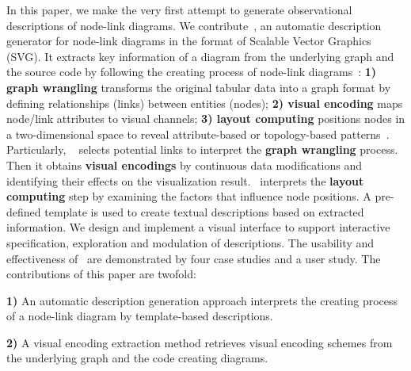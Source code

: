 In this paper, we make the very first attempt to generate observational descriptions of node-link diagrams.
We contribute~\textit{\ApproachName}, an automatic description generator for node-link diagrams in the format of Scalable Vector Graphics (SVG). 
It extracts key information of a diagram from the underlying graph and the source code by following the creating process of node-link diagrams~\cite{DBLP:journals/cgf/SpritzerBDFF15, tvcg/RomatAP21}:
\textbf{1) graph wrangling} transforms the original tabular data into a graph format by defining relationships (links) between entities (nodes);
\textbf{2) visual encoding} maps node/link attributes to visual channels;
\textbf{3) layout computing} positions nodes in a two-dimensional space to reveal attribute-based or topology-based patterns~\cite{DBLP:journals/cgf/NobreMSL19}.
Particularly, \ApproachName~
selects potential links to interpret the \textbf{graph wrangling} process.
Then it obtains \textbf{visual encodings} by continuous data modifications and identifying their effects on the visualization result.
\ApproachName~interprets the \textbf{layout computing} step by examining the factors that influence node positions.
A pre-defined template is used to create textual descriptions based on extracted information. 
We design and implement a visual interface to support interactive specification, exploration and modulation of descriptions.
The usability and effectiveness of \ApproachName~are demonstrated by four case studies and a user study.
The contributions of this paper are twofold:

\noindent \textbf{1)} An automatic description generation approach interprets the creating process of a node-link diagram by template-based descriptions.

\noindent \textbf{2)} A visual encoding extraction method retrieves visual encoding schemes from the underlying graph and the code creating diagrams.